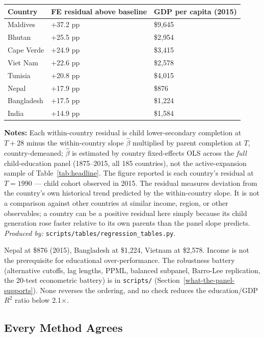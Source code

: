 \documentclass[12pt,letterpaper]{article}
\begin{document}
\begin{longtable}[]{@{}lll@{}}
\toprule
Country & FE residual above baseline & GDP per capita (2015) \\
\midrule
\endhead
Maldives & +37.2 pp & \$9,645 \\
Bhutan & +25.5 pp & \$2,954 \\
Cape Verde & +24.9 pp & \$3,415 \\
Viet Nam & +22.6 pp & \$2,578 \\
Tunisia & +20.8 pp & \$4,015 \\
Nepal & +17.9 pp & \$876 \\
Bangladesh & +17.5 pp & \$1,224 \\
India & +14.9 pp & \$1,584 \\
\bottomrule
\end{longtable}\addtocounter{table}{-1}%

\begin{minipage}{\dimexpr\textwidth-2em}
\scriptsize
\textbf{Notes:} Each within-country residual is
child lower-secondary completion at $T{+}28$ minus the within-country
slope $\hat{\beta}$ multiplied by parent completion at $T$, country-demeaned;
$\hat{\beta}$ is estimated by country fixed-effects OLS across the
\emph{full} child-education panel (1875--2015, all 185 countries),
not the active-expansion sample of Table~\ref{tab:headline}. The figure reported is each
country's residual at $T=1990$ --- child cohort observed in 2015. The
residual measures deviation from the country's own historical trend
predicted by the within-country slope. It is not a comparison against
other countries at similar income, region, or other observables; a
country can be a positive residual here simply because its child
generation rose faster relative to its own parents than the panel
slope predicts.
\textit{Produced by:} \texttt{scripts/tables/regression\_tables.py}.
\end{minipage}

Nepal at \$876 (2015), Bangladesh at \$1,224, Vietnam at \$2,578.
Income is not the prerequisite for educational over-performance. The
robustness battery (alternative cutoffs, lag lengths, PPML, balanced
subpanel, Barro-Lee replication, the 20-test econometric battery) is
in \texttt{scripts/} (Section~\ref{what-the-panel-supports}).
None reverses the ordering, and no check reduces the education/GDP
$R^2$ ratio below 2.1$\times$.

\subsection{Every Method Agrees}\label{every-method-agrees}
\end{document}
